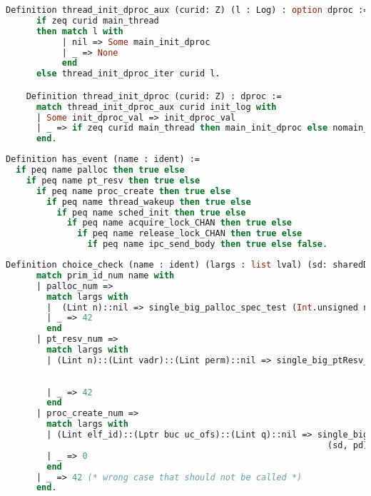\begin{lstlisting}[language=Caml]
    Definition thread_init_dproc_aux (curid: Z) (l : Log) : option dproc :=
      if zeq curid main_thread 
      then match l with 
           | nil => Some main_init_dproc 
           | _ => None
           end
      else thread_init_dproc_iter curid l.

    Definition thread_init_dproc (curid: Z) : dproc :=
      match thread_init_dproc_aux curid init_log with
      | Some init_dproc_val => init_dproc_val
      | _ => if zeq curid main_thread then main_init_dproc else nomain_init_priv_adt
      end.
\end{lstlisting}

\begin{lstlisting}[language=Caml]
Definition has_event (name : ident) :=
  if peq name palloc then true else 
    if peq name pt_resv then true else
      if peq name proc_create then true else
        if peq name thread_wakeup then true else
          if peq name sched_init then true else
            if peq name acquire_lock_CHAN then true else
              if peq name release_lock_CHAN then true else
                if peq name ipc_send_body then true else false.
\end{lstlisting}

\begin{lstlisting}[language=Caml]
    Definition choice_check (name : ident) (largs : list lval) (sd: sharedData) (pd: privData) : Z :=
      match prim_id_num name with 
      | palloc_num =>
        match largs with 
        |  (Lint n)::nil => single_big_palloc_spec_test (Int.unsigned n) (sd, pd)
        | _ => 42
        end
      | pt_resv_num => 
        match largs with 
        | (Lint n)::(Lint vadr)::(Lint perm)::nil => single_big_ptResv_spec_test (Int.unsigned n) 
                                                                                 (Int.unsigned vadr)
                                                                                 (Int.unsigned perm) (sd, pd)
        | _ => 42
        end
      | proc_create_num =>
        match largs with 
        | (Lint elf_id)::(Lptr buc uc_ofs)::(Lint q)::nil => single_big_proc_create_spec_test 
                                                               (sd, pd) buc uc_ofs (Int.unsigned q)
        | _ => 0
        end
      | _ => 42 (* wrong case that should not be called *)
      end.
\end{lstlisting}


